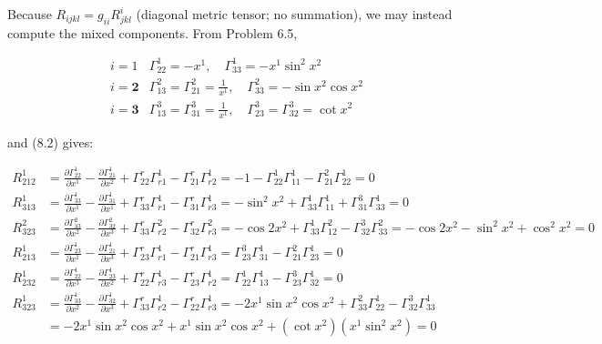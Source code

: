 \documentclass[10pt]{article}
\begin{document}
Because $R_{i j k l}=g_{i i} R_{j k l}^{i}$ (diagonal metric tensor; no summation), we may instead compute the mixed components. From Problem 6.5,

$$
\begin{array}{ll}
i=1 & \Gamma_{22}^{1}=-x^{1}, \quad \Gamma_{33}^{1}=-x^{1} \sin ^{2} x^{2} \\
i=\mathbf{2} & \Gamma_{13}^{2}=\Gamma_{21}^{2}=\frac{1}{x^{1}}, \quad \Gamma_{33}^{2}=-\sin x^{2} \cos x^{2} \\
i=\mathbf{3} & \Gamma_{13}^{3}=\Gamma_{31}^{3}=\frac{1}{x^{1}}, \quad \Gamma_{23}^{3}=\Gamma_{32}^{3}=\cot x^{2}
\end{array}
$$

and (8.2) gives:

$$
\begin{aligned}
R_{212}^{1} & =\frac{\partial \Gamma_{22}^{1}}{\partial x^{1}}-\frac{\partial \Gamma_{21}^{1}}{\partial x^{2}}+\Gamma_{22}^{r} \Gamma_{r 1}^{1}-\Gamma_{21}^{r} \Gamma_{r 2}^{1}=-1-\Gamma_{22}^{1} \Gamma_{11}^{1}-\Gamma_{21}^{2} \Gamma_{22}^{1}=0 \\
R_{313}^{1} & =\frac{\partial \Gamma_{33}^{1}}{\partial x^{1}}-\frac{\partial \Gamma_{31}^{1}}{\partial x^{1}}+\Gamma_{33}^{r} \Gamma_{r 1}^{1}-\Gamma_{31}^{r} \Gamma_{r 3}^{1}=-\sin ^{2} x^{2}+\Gamma_{33}^{1} \Gamma_{11}^{1}+\Gamma_{31}^{3} \Gamma_{33}^{1}=0 \\
R_{323}^{2} & =\frac{\partial \Gamma_{33}^{2}}{\partial x^{2}}-\frac{\partial \Gamma_{32}^{2}}{\partial x^{3}}+\Gamma_{33}^{r} \Gamma_{r 2}^{2}-\Gamma_{32}^{r} \Gamma_{r 3}^{2}=-\cos 2 x^{2}+\Gamma_{33}^{1} \Gamma_{12}^{2}-\Gamma_{32}^{3} \Gamma_{33}^{2}=-\cos 2 x^{2}-\sin ^{2} x^{2}+\cos ^{2} x^{2}=0 \\
R_{213}^{1} & =\frac{\partial \Gamma_{23}^{1}}{\partial x^{1}}-\frac{\partial \Gamma_{21}^{1}}{\partial x^{3}}+\Gamma_{23}^{r} \Gamma_{r 1}^{1}-\Gamma_{21}^{r} \Gamma_{r 3}^{1}=\Gamma_{23}^{3} \Gamma_{31}^{1}-\Gamma_{21}^{2} \Gamma_{23}^{1}=0 \\
R_{232}^{1} & =\frac{\partial \Gamma_{22}^{1}}{\partial x^{3}}-\frac{\partial \Gamma_{23}^{1}}{\partial x^{2}}+\Gamma_{22}^{r} \Gamma_{r 3}^{1}-\Gamma_{23}^{r} \Gamma_{r 2}^{1}=\Gamma_{22}^{1} \Gamma_{13}^{1}-\Gamma_{23}^{3} \Gamma_{32}^{1}=0 \\
R_{323}^{1} & =\frac{\partial \Gamma_{33}^{1}}{\partial x^{2}}-\frac{\partial \Gamma_{32}^{1}}{\partial x^{3}}+\Gamma_{33}^{r} \Gamma_{r 2}^{1}-\Gamma_{22}^{r} \Gamma_{r 3}^{1}=-2 x^{1} \sin x^{2} \cos x^{2}+\Gamma_{33}^{2} \Gamma_{22}^{1}-\Gamma_{32}^{3} \Gamma_{33}^{1} \\
& =-2 x^{1} \sin x^{2} \cos x^{2}+x^{1} \sin x^{2} \cos x^{2}+\left(\cot x^{2}\right)\left(x^{1} \sin ^{2} x^{2}\right)=0
\end{aligned}
$$
\end{document}
